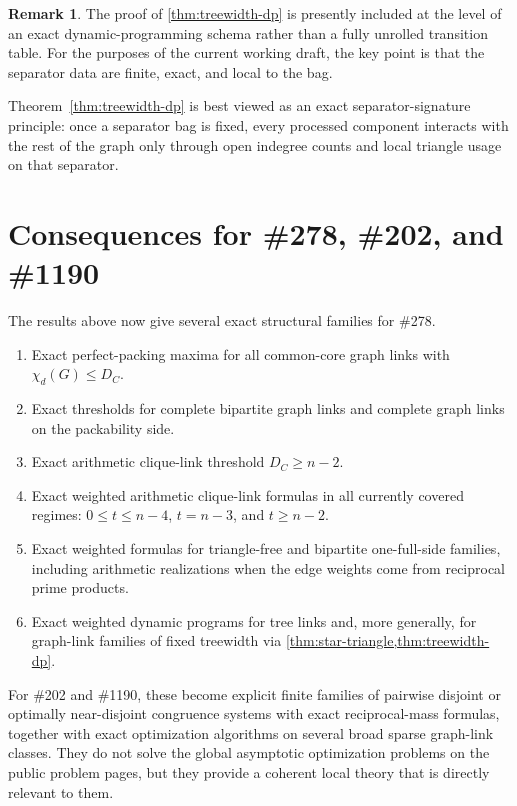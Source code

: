 \documentclass[11pt]{article}
\theoremstyle{definition}
\newtheorem{remark}[theorem]{Remark}
\newcommand{\Chi}{\chi}
\begin{document}
\begin{remark}
The proof of \cref{thm:treewidth-dp} is presently included at the level of an exact dynamic-programming schema rather than a fully unrolled transition table. For the purposes of the current working draft, the key point is that the separator data are finite, exact, and local to the bag.
\end{remark}

Theorem~\ref{thm:treewidth-dp} is best viewed as an exact separator-signature principle: once a separator bag is fixed, every processed component interacts with the rest of the graph only through open indegree counts and local triangle usage on that separator.


\section{Consequences for \#278, \#202, and \#1190}
The results above now give several exact structural families for \#278.

\begin{enumerate}[label=(\arabic*)]
    \item Exact perfect-packing maxima for all common-core graph links with \(\Chi_d(G)\le D_C\).
    \item Exact thresholds for complete bipartite graph links and complete graph links on the packability side.
    \item Exact arithmetic clique-link threshold \(D_C\ge n-2\).
    \item Exact weighted arithmetic clique-link formulas in all currently covered regimes:
    \(0\le t\le n-4\), \(t=n-3\), and \(t\ge n-2\).
    \item Exact weighted formulas for triangle-free and bipartite one-full-side families, including arithmetic realizations when the edge weights come from reciprocal prime products.
    \item Exact weighted dynamic programs for tree links and, more generally, for graph-link families of fixed treewidth via \cref{thm:star-triangle,thm:treewidth-dp}.
\end{enumerate}

For \#202 and \#1190, these become explicit finite families of pairwise disjoint or optimally near-disjoint congruence systems with exact reciprocal-mass formulas, together with exact optimization algorithms on several broad sparse graph-link classes. They do not solve the global asymptotic optimization problems on the public problem pages, but they provide a coherent local theory that is directly relevant to them.
\end{document}
